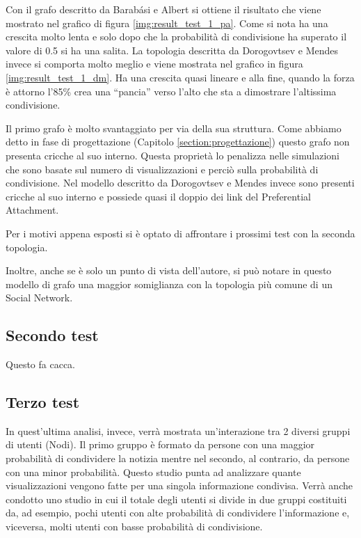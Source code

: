 Con il grafo descritto da Barabási e Albert si ottiene il risultato che viene mostrato nel grafico di figura \ref{img:result_test_1_pa}.
Come si nota ha una crescita molto lenta e solo dopo che la probabilità di condivisione ha superato il valore di 0.5 si ha una salita.
La topologia descritta da Dorogovtsev e Mendes invece si comporta molto meglio e viene mostrata nel grafico in figura \ref{img:result_test_1_dm}.
Ha una crescita quasi lineare e alla fine, quando la forza è attorno l'85\% crea una ``pancia'' verso l'alto che sta a dimostrare l'altissima 
condivisione.

Il primo grafo è molto svantaggiato per via della sua struttura. Come abbiamo detto in fase di progettazione (Capitolo \ref{section:progettazione}) 
questo grafo non presenta cricche al suo interno.
Questa proprietà lo penalizza nelle simulazioni che sono basate sul numero di visualizzazioni e perciò sulla probabilità di condivisione.
Nel modello descritto da Dorogovtsev e Mendes invece sono presenti cricche al suo interno e possiede quasi il doppio dei link del Preferential Attachment.

Per i motivi appena esposti si è optato di affrontare i prossimi test con la seconda topologia.

Inoltre, anche se è solo un punto di vista dell'autore, si può notare in questo modello di grafo una 
maggior somiglianza con la topologia più comune di un Social Network.


\subsection{Secondo test}
\label{section:second_test}

Questo fa cacca.




\subsection{Terzo test}
\label{section:third_test}

In quest'ultima analisi, invece, verrà mostrata un'interazione tra 2 diversi gruppi di utenti (Nodi).
Il primo gruppo è formato da persone con una maggior probabilità di condividere la notizia 
mentre nel secondo, al contrario, da persone con una minor probabilità.
Questo studio punta ad analizzare quante visualizzazioni vengono fatte per una singola informazione condivisa.
Verrà anche condotto uno studio in cui il totale degli utenti si divide in due gruppi costituiti da, ad esempio, 
pochi utenti con alte probabilità di condividere l'informazione e, viceversa, 
molti utenti con basse probabilità di condivisione.

